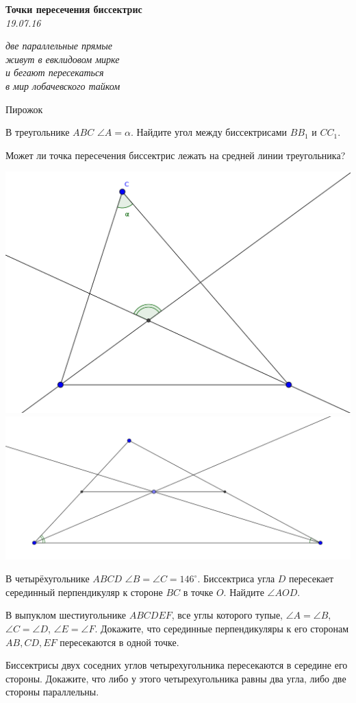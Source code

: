 \begin{center}
\textbf{\Large Точки пересечения биссектрис}\\
\textit{19.07.16}
\end{center}

\epigraph{\it две параллельные прямые\\
живут в евклидовом мирке\\
и бегают пересекаться\\
в мир лобачевского тайком}{Пирожок}

\begin{problems}
\item В треугольнике $ABC$ $\angle A=\alpha$. Найдите угол между биссектрисами $BB_1$ и $CC_1$.

\item Может ли точка пересечения биссектрис лежать на средней линии треугольника?

\begin{center}
	\includegraphics[width=.45\textwidth]{incen01}
	\includegraphics[width=.45\textwidth]{incen02}
\end{center}

\item В четырёхугольнике $ABCD$ $\angle B=\angle C=146^{\circ}$. Биссектриса угла $D$ пересекает серединный перпендикуляр к стороне $BC$ в точке $O$. Найдите $\angle AOD$.

\item В выпуклом шестиугольнике $ABCDEF$, все углы которого тупые, $\angle A=\angle B$, $\angle C=\angle D$, $\angle E=\angle F$. Докажите, что серединные перпендикуляры к его сторонам $AB, CD, EF$ пересекаются в одной точке.

\item Биссектрисы двух соседних углов четырехугольника пересекаются в середине его стороны. Докажите, что либо у этого четырехугольника равны два угла, либо две стороны параллельны. 


\end{problems}
